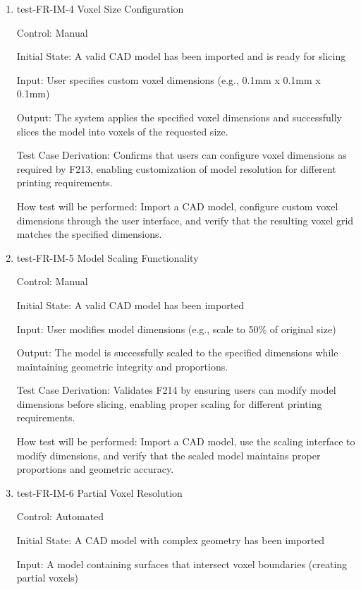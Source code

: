 \documentclass[12pt, titlepage]{article}
\begin{document}
\begin{enumerate}

\item{test-FR-IM-4 Voxel Size Configuration\\}

Control: Manual
					
Initial State: A valid CAD model has been imported and is ready for slicing
					
Input: User specifies custom voxel dimensions (e.g., 0.1mm x 0.1mm x 0.1mm)
					
Output: The system applies the specified voxel dimensions and successfully slices the
model into voxels of the requested size.

Test Case Derivation: Confirms that users can configure voxel dimensions as required by F213,
enabling customization of model resolution for different printing requirements.
					
How test will be performed: Import a CAD model, configure custom voxel dimensions through
the user interface, and verify that the resulting voxel grid matches the specified dimensions.

\item{test-FR-IM-5 Model Scaling Functionality\\}

Control: Manual
					
Initial State: A valid CAD model has been imported
					
Input: User modifies model dimensions (e.g., scale to 50\% of original size)
					
Output: The model is successfully scaled to the specified dimensions while maintaining
geometric integrity and proportions.

Test Case Derivation: Validates F214 by ensuring users can modify model dimensions before
slicing, enabling proper scaling for different printing requirements.
					
How test will be performed: Import a CAD model, use the scaling interface to modify dimensions,
and verify that the scaled model maintains proper proportions and geometric accuracy.

\item{test-FR-IM-6 Partial Voxel Resolution\\}

Control: Automated
					
Initial State: A CAD model with complex geometry has been imported
					
Input: A model containing surfaces that intersect voxel boundaries (creating partial voxels)
					

\end{enumerate}
\end{document}
